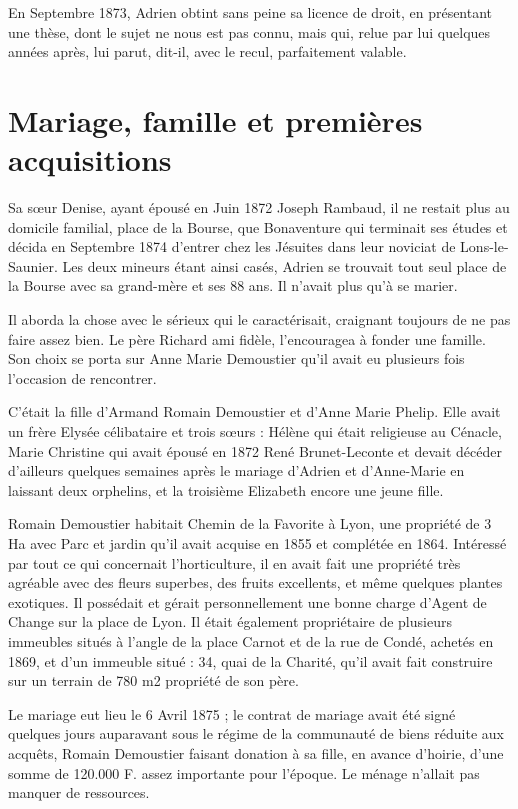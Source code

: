 \documentclass[11pt,a4paper]{report}
\begin{document}
En Septembre 1873, Adrien obtint sans peine sa licence de droit, en présentant une thèse, dont le sujet ne nous est pas connu, mais qui, relue par lui quelques années après, lui parut, dit-il, avec le recul, parfaitement valable.

\chapter{Mariage, famille et premières acquisitions}\label{mariage-famille-et-premiuxe8res-acquisitions}

Sa sœur Denise, ayant épousé en Juin 1872 Joseph Rambaud, il ne restait plus au domicile familial, place de la Bourse, que Bonaventure qui terminait ses études et décida en Septembre 1874 d'entrer chez les Jésuites dans leur noviciat de Lons-le-Saunier. Les deux mineurs étant ainsi casés, Adrien se trouvait tout seul place de la Bourse avec sa grand-mère et ses 88 ans. Il n'avait plus qu'à se marier.

Il aborda la chose avec le sérieux qui le caractérisait, craignant toujours de ne pas faire assez bien. Le père Richard ami fidèle, l'encouragea à fonder une famille. Son choix se porta sur Anne Marie Demoustier qu'il avait eu plusieurs fois l'occasion de rencontrer.

C'était la fille d'Armand Romain Demoustier et d'Anne Marie Phelip. Elle avait un frère Elysée célibataire et trois sœurs : Hélène qui était religieuse au Cénacle, Marie Christine qui avait épousé en 1872 René Brunet-Leconte et devait décéder d'ailleurs quelques semaines après le mariage d'Adrien et d'Anne-Marie en laissant deux orphelins, et la troisième Elizabeth encore une jeune fille.


Romain Demoustier habitait Chemin de la Favorite à Lyon, une propriété de 3 Ha avec Parc et jardin qu'il avait acquise en 1855 et complétée en 1864. Intéressé par tout ce qui concernait l'horticulture, il en avait fait une propriété très agréable avec des fleurs superbes, des fruits excellents, et même quelques plantes exotiques. Il possédait et gérait personnellement une bonne charge d'Agent de Change sur la place de Lyon. Il était également propriétaire de plusieurs immeubles situés à l'angle de la place Carnot et de la rue de Condé, achetés en 1869, et d'un immeuble situé : 34, quai de la Charité, qu'il avait fait construire sur un terrain de 780 m2 propriété de son père.

Le mariage eut lieu le 6 Avril 1875 ; le contrat de mariage avait été signé quelques jours auparavant sous le régime de la communauté de biens réduite aux acquêts, Romain Demoustier faisant donation à sa fille, en avance d'hoirie, d'une somme de 120.000 F. assez importante pour l'époque. Le ménage n'allait pas manquer de ressources.
\end{document}
